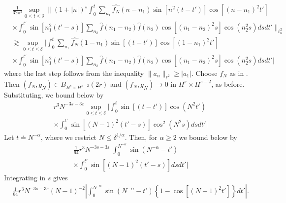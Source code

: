 \documentclass[12pt,reqno]{amsart}
\numberwithin{equation}{section}  %
\renewcommand{\cref}{\Cref}
\newcommand{\wh}{\widehat}
\newcommand{\ee}{\varepsilon}
\begin{document}
\begin{equation*}
\begin{split}
  & \frac{1}{32 \pi^{5}} \sup_{0 \le t \le \delta} \| (1 + | n |)^{s}  
  \int_{0}^{t} \sum_{n_{1}} \wh{f_{N}}(n - n_{1}) \sin[n^{2}(t - t')]
  \cos[(n - n_{1})^{2}t']
  \\
  & \times \int_{0}^{t'} \sin[n_{1}^{2}(t' -s)]
  \sum_{n_{2}} 
  \wh{f}(n_{1} - n_{2}) \wh{f}(n_{2}) \cos[(n_{1} - n_{2})^{2}s ]
  \cos(n_{2}^{2}s) ds dt'
  \|_{\ell^{2}_{n}}
  \\
  & \gtrsim \sup_{0 \le t \le \delta} 
  | \int_{0}^{t} \sum_{n_{1}} \wh{f_{N}}(1 - n_{1}) \sin[(t - t')]
  \cos[(1 - n_{1})^{2}t']
  \\
  & \times \int_{0}^{t'} \sin[n_{1}^{2}(t' -s)]
  \sum_{n_{2}} 
  \wh{f}(n_{1} - n_{2}) \wh{f}(n_{2}) \cos[(n_{1} - n_{2})^{2}s ]
  \cos(n_{2}^{2}s) ds dt' |
\end{split}
\end{equation*}
%
where the last step follows from the inequality $\| a_{n} \|_{\ell^{2}} \ge
|a_{1}|$. Choose $f_N$ as in \cref{ill-pos-ce}. Then
$(f_{N}, g_{N}) \in B_{H^{s} \times H^{s-2}}(2r)$ and $(f_{N}, g_{N}) \to 0$ in
$H^{s} \times H^{s-2}$, as before. Substituting, we bound below by
%
%
%
\begin{equation*}
\begin{split}
  & r^{3} N^{-3s - 3 \ee} \sup_{0 \le t \le \delta} 
  | \int_{0}^{t} \sin[(t - t')] \cos(N^{2}t')
  \\
  & \times \int_{0}^{t'} \sin[(N-1)^{2}(t' -s)]
  \cos^{2}(N^{2}s )
  ds dt' |
\end{split}
\end{equation*}
%
Let $t \doteq N^{-\alpha}$, where we restrict $N \le
\delta^{1/\alpha}$. Then, for $\alpha \ge 2$ we bound below by
%
%
\begin{equation*}
\begin{split}
  & \frac{1}{64} r^{3} N^{-3s - 3 \ee} 
  | \int_{0}^{N^{-\alpha}} \sin(N^{-\alpha} - t') 
  \\
  & \times \int_{0}^{t'} \sin[(N-1)^{2}(t' -s)]
  ds dt' |
\end{split}
\end{equation*}
%
%
%
%
%
Integrating in $s$ gives
%
%
\begin{equation}
  \label{gfd}
\begin{split}
  & \frac{1}{64} r^{3} N^{-3s - 3 \ee}(N-1)^{-2} 
| \int_{0}^{N^{-\alpha}} \sin(N^{-\alpha} - t')
\left\{1 -\cos[ (N-1)^{2}t']  \right \} dt' |.
\end{split}
\end{equation}
\end{document}
